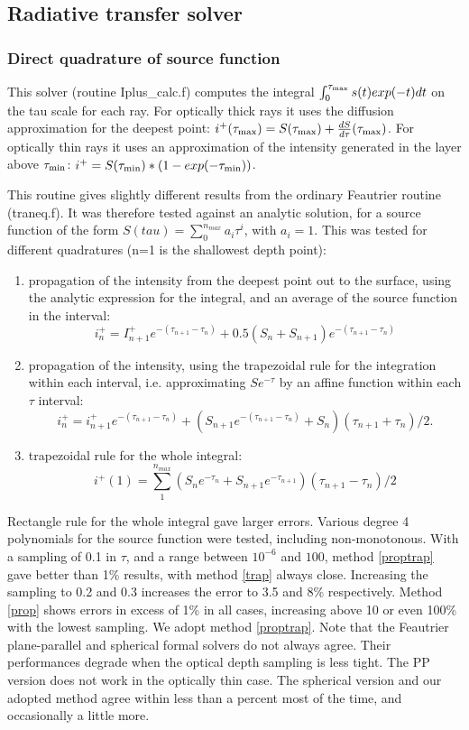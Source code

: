 \documentclass[a4paper,12pt]{article}
\begin{document}
\subsection{Radiative transfer solver}
\subsubsection{Direct quadrature of source function}
This solver (routine Iplus\_calc.f) computes the integral ${\int_0^{\tau_{\rm max}}s(t) exp(-t) dt}$ on the tau scale for each 
ray. For optically thick rays it uses the diffusion approximation for the deepest point: 
$i^+(\tau_{\rm max}) = S(\tau_{\rm max})+\frac{dS}{d\tau}(\tau_{\rm max})$.
For optically thin rays it uses an approximation of the intensity generated in the layer above $\tau_{\rm min}$: 
$i^+ = S(\tau_{\rm min}) * (1-exp(-\tau_{\rm min}))$.

This routine gives slightly different results from the ordinary Feautrier routine (traneq.f). It was therefore tested against
an analytic solution, for a source function of the form $S(tau)=\sum_0^{n_{max}}{a_i \tau^i}$, with $a_i = 1$.
This was tested  for different quadratures (n=1 is the shallowest depth point):
\begin{enumerate}
\item propagation of the intensity from the deepest point out to the surface, using the analytic expression for the integral, 
and an average of the source function in the interval: 
$$i^+_n=I^+_{n+1} e^{-(\tau_{n+1}-\tau_{n})} + 0.5 (S_{n}+S_{n+1}) e^{-(\tau_{n+1}-\tau_{n})}$$\label{prop}
\item propagation of the intensity, using the trapezoidal rule for the integration within each interval, i.e. approximating $Se^{-\tau}$ by an affine function within each $\tau$ interval: 
$$i^+_n=i^+_{n+1} e^{-(\tau_{n+1}-\tau_{n})}+ (S_{n+1} e^{-(\tau_{n+1}-\tau_{n})} + S_n) (\tau_{n+1}+\tau_n)/2.$$\label{proptrap}
\item trapezoidal rule for the whole integral: 
$$i^+(1)=\sum_1^{n_{max}}{(S_{n}e^{-\tau_n}+S_{n+1}e^{-\tau_{n+1}})(\tau_{n+1}-\tau_{n})/2}$$\label{trap}
\end{enumerate}
Rectangle rule for the whole integral gave larger errors.
Various degree 4 polynomials for the source function were tested, including non-monotonous.
With a sampling of 0.1 in $\tau$, and a range between $10^{-6}$ and $100$, method \ref{proptrap} gave better than 1\% results, with method \ref{trap} always close. Increasing the sampling to 0.2 and 0.3 increases the error to 
3.5 and 8\% respectively.
Method \ref{prop} shows errors in excess of 1\% in all cases, increasing above 10 or even 100\% with the lowest sampling.
We adopt method \ref{proptrap}.
Note that the Feautrier plane-parallel and spherical formal solvers do not always agree. Their performances degrade
when the optical depth sampling is less tight. The PP version does not work in the optically thin case.
The spherical version and our adopted method agree within less than a percent most of the time, and occasionally a 
little more.
\end{document}
